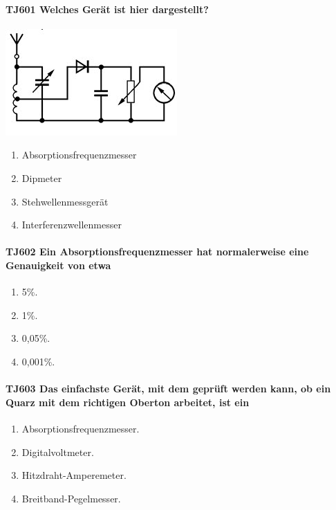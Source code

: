 \documentclass[8pt]{article}
\begin{document}
\paragraph*{TJ601 Welches Gerät ist hier dargestellt?}
\begin{center}
	\begin{minipage}{\linewidth}
		\centering
		\includegraphics[scale=1.0]{pics/tj601_a.jpg}
	\end{minipage}
\end{center}
\begin{enumerate}[nolistsep,label=\Alph*]
\item Absorptionsfrequenzmesser
\item Dipmeter
\item Stehwellenmessgerät
\item Interferenzwellenmesser
\end{enumerate}

\paragraph*{TJ602 Ein Absorptionsfrequenzmesser hat normalerweise eine Genauigkeit von etwa} 
\begin{enumerate}[nolistsep,label=\Alph*]
\item 5\%.
\item 1\%.
\item 0,05\%.
\item 0,001\%.
\end{enumerate}

\paragraph*{TJ603 Das einfachste Gerät, mit dem geprüft werden kann, ob ein Quarz mit dem richtigen Oberton arbeitet, ist ein} 
\begin{enumerate}[nolistsep,label=\Alph*]
\item Absorptionsfrequenzmesser.
\item Digitalvoltmeter.
\item Hitzdraht-Amperemeter.
\item Breitband-Pegelmesser.
\end{enumerate}
\end{document}
